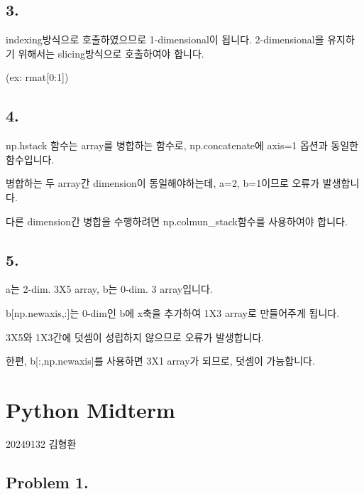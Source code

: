 \documentclass[
  letterpaper,
  DIV=11,
  numbers=noendperiod]{scrreprt}
\begin{document}
\section*{3.}\label{section-7}


indexing방식으로 호출하였으므로 1-dimensional이 됩니다. 2-dimensional을
유지하기 위해서는 slicing방식으로 호출하여야 합니다.

(ex: rmat{[}0:1{]})

\section*{4.}\label{section-8}


np.hstack 함수는 array를 병합하는 함수로, np.concatenate에 axis=1 옵션과
동일한 함수입니다.

병합하는 두 array간 dimension이 동일해야하는데, a=2, b=1이므로 오류가
발생합니다.

다른 dimension간 병합을 수행하려면 np.colmun\_stack함수를 사용하여야
합니다.

\section*{5.}\label{section-9}


a는 2-dim. 3X5 array, b는 0-dim. 3 array입니다.

b{[}np.newaxis,:{]}는 0-dim인 b에 x축을 추가하여 1X3 array로 만들어주게
됩니다.

3X5와 1X3간에 덧셈이 성립하지 않으므로 오류가 발생합니다.

한편, b{[}:,np.newaxis{]}를 사용하면 3X1 array가 되므로, 덧셈이
가능합니다.

\chapter*{Python Midterm}\label{python-midterm}


20249132 김형환

\section*{Problem 1.}\label{problem-1.}
\end{document}

